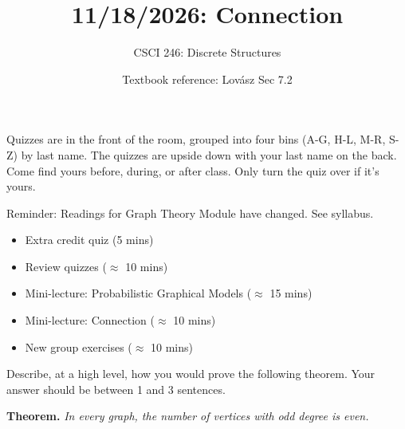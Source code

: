 \documentclass[10pt]{beamer}
\begin{document}
\title{11/18/2026: Connection}
\author{CSCI 246: Discrete Structures}
\date{Textbook reference: Lov\'asz Sec 7.2}

\begin{frame}
    \titlepage 
\end{frame}

\begin{frame}
\begin{mygreenbox}[title=Graded Quiz Pickup]
Quizzes are in the front of the room, grouped into four bins (A-G, H-L, M-R, S-Z) by last name. The quizzes are upside down with your last name on the back. Come find yours before, during, or after class. Only turn the quiz over if it's yours. 
\end{mygreenbox} 
\vfill 
\begin{myredbox}[title=\text{Announcements}]
Reminder: Readings for Graph Theory Module have changed. See syllabus.
\end{myredbox}

\vfill 
\begin{myyellowbox}[title=Today's Agenda]
\begin{itemize}
	\item Extra credit quiz (5 mins)
	\item Review quizzes ($\approx$ 10 mins)
	\item Mini-lecture: Probabilistic Graphical Models ($\approx$ 15 mins)
	\item Mini-lecture: Connection ($\approx$ 10 mins)
	\item New group exercises ($\approx$ 10 mins)
\end{itemize}


\end{myyellowbox}
\vfill 

\end{frame}




\begin{frame}

\begin{mygreenbox}[title=\text{Extra Credit Reading Quiz (Lov\'asz Sec 7.1)}]
Describe, at a high level, how you would prove the following theorem. Your answer should be between 1 and 3 sentences. \\

\vspace{.4cm}

\textbf{Theorem.} \textit{In every graph, the number of vertices with odd degree is even.}  
\end{mygreenbox}
		
\end{frame}
\end{document}
